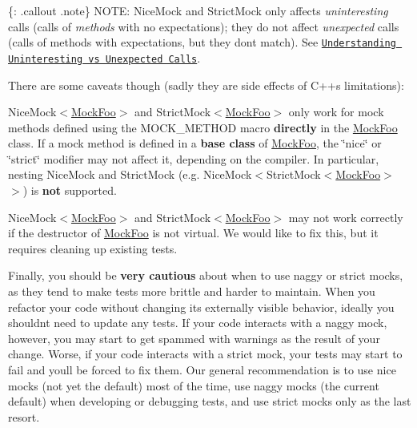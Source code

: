\{\+: .callout .note\} N\+O\+TE\+: {\ttfamily Nice\+Mock} and {\ttfamily Strict\+Mock} only affects {\itshape uninteresting} calls (calls of {\itshape methods} with no expectations); they do not affect {\itshape unexpected} calls (calls of methods with expectations, but they don\textquotesingle{}t match). See \href{#uninteresting-vs-unexpected}{\tt Understanding Uninteresting vs Unexpected Calls}.

There are some caveats though (sadly they are side effects of C++\textquotesingle{}s limitations)\+:


\begin{DoxyEnumerate}
\item {\ttfamily Nice\+Mock$<$\mbox{\hyperlink{classMockFoo}{Mock\+Foo}}$>$} and {\ttfamily Strict\+Mock$<$\mbox{\hyperlink{classMockFoo}{Mock\+Foo}}$>$} only work for mock methods defined using the {\ttfamily M\+O\+C\+K\+\_\+\+M\+E\+T\+H\+OD} macro {\bfseries directly} in the {\ttfamily \mbox{\hyperlink{classMockFoo}{Mock\+Foo}}} class. If a mock method is defined in a {\bfseries base class} of {\ttfamily \mbox{\hyperlink{classMockFoo}{Mock\+Foo}}}, the \char`\"{}nice\char`\"{} or \char`\"{}strict\char`\"{} modifier may not affect it, depending on the compiler. In particular, nesting {\ttfamily Nice\+Mock} and {\ttfamily Strict\+Mock} (e.\+g. {\ttfamily Nice\+Mock$<$Strict\+Mock$<$\mbox{\hyperlink{classMockFoo}{Mock\+Foo}}$>$ $>$}) is {\bfseries not} supported.
\item {\ttfamily Nice\+Mock$<$\mbox{\hyperlink{classMockFoo}{Mock\+Foo}}$>$} and {\ttfamily Strict\+Mock$<$\mbox{\hyperlink{classMockFoo}{Mock\+Foo}}$>$} may not work correctly if the destructor of {\ttfamily \mbox{\hyperlink{classMockFoo}{Mock\+Foo}}} is not virtual. We would like to fix this, but it requires cleaning up existing tests.
\end{DoxyEnumerate}

Finally, you should be {\bfseries very cautious} about when to use naggy or strict mocks, as they tend to make tests more brittle and harder to maintain. When you refactor your code without changing its externally visible behavior, ideally you shouldn\textquotesingle{}t need to update any tests. If your code interacts with a naggy mock, however, you may start to get spammed with warnings as the result of your change. Worse, if your code interacts with a strict mock, your tests may start to fail and you\textquotesingle{}ll be forced to fix them. Our general recommendation is to use nice mocks (not yet the default) most of the time, use naggy mocks (the current default) when developing or debugging tests, and use strict mocks only as the last resort.

